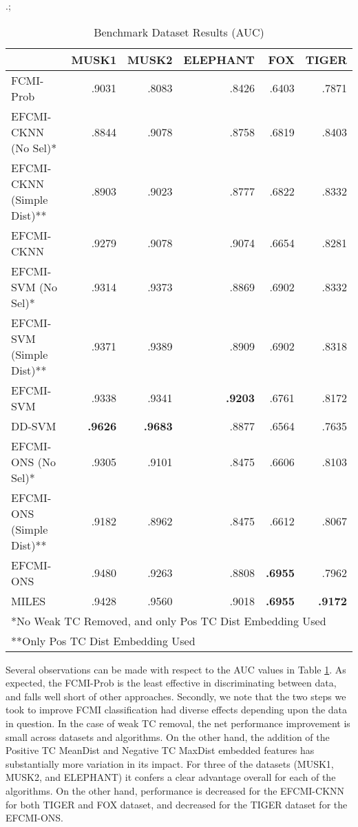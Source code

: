 \documentclass[12pt,dvips]{report}
\numberwithin{equation}{section}
\begin{document}
\begin {table}[H]
\caption{Benchmark Dataset Results (AUC)} \label{tab:ResultsBenchmark} .;
\begin{center}
\begin{tabular}{lrrrrr}
\hline


& MUSK1& MUSK2 & ELEPHANT & FOX & TIGER \\
\hline
FCMI-Prob     & .9031 & .8083 & .8426 & .6403 & .7871 \\
\hline
EFCMI-CKNN (No Sel)*    & .8844 & .9078 & .8758 & .6819 & .8403 \\
EFCMI-CKNN (Simple Dist)**    & .8903 & .9023 & .8777 & .6822 & .8332 \\
EFCMI-CKNN & .9279 & .9078 & .9074 & .6654 & .8281 \\
\hline
EFCMI-SVM (No Sel)*    & .9314 & .9373 & .8869 & .6902 & .8332 \\
EFCMI-SVM (Simple Dist)**    & .9371 & .9389 & .8909 & .6902 & .8318 \\
EFCMI-SVM & .9338 & .9341 & \textbf{.9203} & .6761 & .8172 \\
DD-SVM & \textbf{.9626} & \textbf{.9683} & .8877 & .6564 & .7635 \\
\hline
EFCMI-ONS (No Sel)*    & .9305 & .9101 & .8475 & .6606 & .8103 \\
EFCMI-ONS (Simple Dist)**    & .9182 & .8962 & .8475 & .6612 & .8067 \\
EFCMI-ONS  & .9480 & .9263 & .8808 & \textbf{.6955} & .7962 \\
MILES & .9428 & .9560 & .9018 & \textbf{.6955} & \textbf{.9172} \\
\hline
\multicolumn{6}{l}{*No Weak TC Removed, and only Pos TC Dist Embedding Used}\\
\multicolumn{6}{l}{**Only Pos TC Dist Embedding Used   }\\
\hline
\end{tabular}
\end{center}
\end{table}

Several observations can be made with respect to the AUC values in Table \ref{tab:ResultsBenchmark}.  As expected, the FCMI-Prob is the least effective in discriminating between data, and falls well short of other approaches.  Secondly, we note that the two steps we took to improve FCMI classification had diverse effects depending upon the data in question.  In the case of weak TC removal, the net performance improvement is small across datasets and algorithms.  On the other hand, the addition of the Positive TC MeanDist and Negative TC MaxDist embedded features has substantially more variation in its impact.  For three of the datasets (MUSK1, MUSK2, and ELEPHANT) it confers a clear advantage overall for each of the algorithms.  On the other hand, performance is decreased for the EFCMI-CKNN for both TIGER and FOX dataset, and decreased for the TIGER dataset for the EFCMI-ONS.
\end{document}
